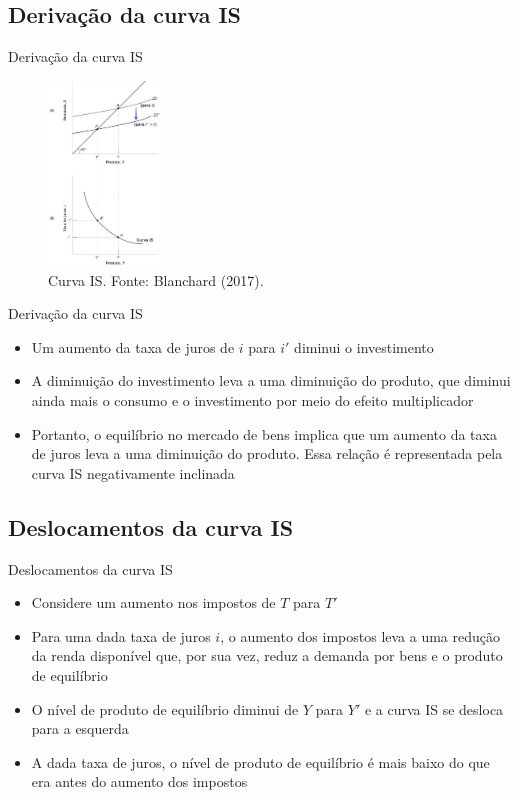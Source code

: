\documentclass[10pt]{beamer}
\begin{document}
\subsection{Derivação da curva IS}
\begin{frame}{Derivação da curva IS}
    \begin{figure}
        \centering
        \includegraphics[width=0.27\textwidth]{./figures/aula082_fig1.JPG}
        \caption{Curva IS. Fonte: Blanchard (2017).}
        \label{IS}
    \end{figure}
\end{frame}

\begin{frame}{Derivação da curva IS}
\begin{itemize}
    \item Um aumento da taxa de juros de $i$ para $i'$ diminui o investimento
    \bigskip
    \item A diminuição do investimento leva a uma diminuição do produto, que diminui ainda mais o consumo e o investimento por meio do efeito multiplicador
    \bigskip
    \item Portanto, o equilíbrio no mercado de bens implica que um aumento da taxa de juros leva a uma diminuição do produto. Essa relação é representada pela curva IS negativamente inclinada
\end{itemize}
\end{frame}

\subsection{Deslocamentos da curva IS}
\begin{frame}{Deslocamentos da curva IS}
    \begin{itemize}
        \item Considere um aumento nos impostos de $T$ para $T'$
        \bigskip
        \item Para uma dada taxa de juros $i$, o aumento dos impostos leva a uma redução da renda disponível que, por sua vez, reduz a demanda por bens e o produto de equilíbrio
        \bigskip
        \item O nível de produto de equilíbrio diminui de $Y$ para $Y'$ e a curva IS se desloca para a esquerda
        \bigskip
        \item A dada taxa de juros, o nível de produto de equilíbrio é mais baixo do que era antes do aumento dos impostos
    \end{itemize}
\end{frame}
\end{document}
